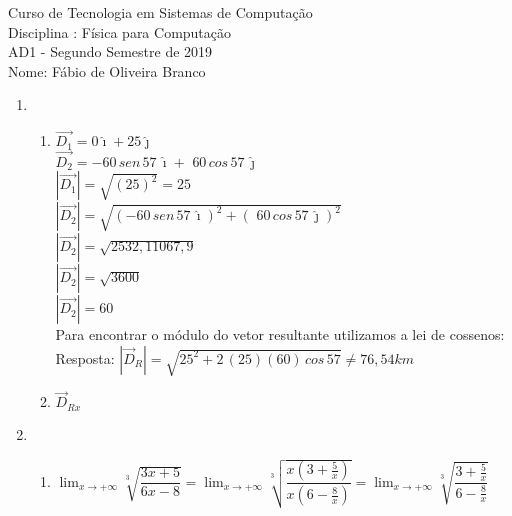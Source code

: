 \documentclass[a4paper, 12pt]{article}
\begin{document}
\begin{center}
Curso de Tecnologia em Sistemas de Computação \\
Disciplina : Física para Computação \\
AD1 - Segundo Semestre de 2019 \\
Nome: Fábio de Oliveira Branco\\ 
\end{center} 


\begin{enumerate}
\item \begin{enumerate}
	\item 
	 $\vec{D_1} = 0\hat{\imath} + 25\hat{\jmath}$ \\
	
	$\vec{D_2} = -60 \, sen\,57\,\hat{\imath} + \,\,60 \, cos\,57\,\hat{\jmath}$ \\
	
	$|\vec{D_1}| = \sqrt{(25)^2} = 25$ \\
	
	$|\vec{D_2}| = \sqrt{(-60 \, sen\,57\,\hat{\imath})^2 + ( \,\,60 \, cos\,57\,\hat{\jmath})^2}$ \\
	
	$|\vec{D_2}| = \sqrt{2532,1 1067,9}$ \\
	
	$|\vec{D_2}| = \sqrt{3600}$ \\
	
	$|\vec{D_2}| = 60$ \\
	
	Para encontrar o módulo do vetor resultante utilizamos a lei de cossenos: \\ 
	
	 Resposta: $|\vec{D}_R| = \sqrt{25^2 + 2\,(25)(60)\, cos\,57} \neq 76,54km$\\
	
	\item $\vec{D}_{Rx}$
\end{enumerate}

\item \begin{enumerate}
	\item $\displaystyle{\lim_{x\to+\infty} \sqrt[3]{\dfrac{3x + 5}{6x - 8}}} = \displaystyle{\lim_{x\to+\infty} \sqrt[3]{\dfrac{x(3 +\frac{5}{x})}{x(6 - \frac{8}{x})}}} = 		\displaystyle{\lim_{x\to+\infty} \sqrt[3]{\dfrac{3 +\frac{5}{x}}{6 - \frac{8}{x}}}}$ \\ \\
	

\end{enumerate}
\end{enumerate}
\end{document}
